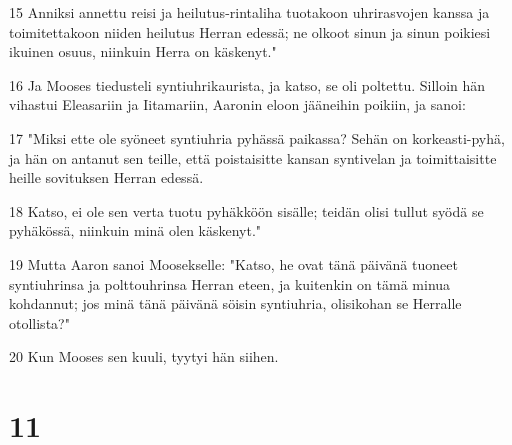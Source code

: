 \par 15 Anniksi annettu reisi ja heilutus-rintaliha tuotakoon uhrirasvojen kanssa ja toimitettakoon niiden heilutus Herran edessä; ne olkoot sinun ja sinun poikiesi ikuinen osuus, niinkuin Herra on käskenyt."
\par 16 Ja Mooses tiedusteli syntiuhrikaurista, ja katso, se oli poltettu. Silloin hän vihastui Eleasariin ja Iitamariin, Aaronin eloon jääneihin poikiin, ja sanoi:
\par 17 "Miksi ette ole syöneet syntiuhria pyhässä paikassa? Sehän on korkeasti-pyhä, ja hän on antanut sen teille, että poistaisitte kansan syntivelan ja toimittaisitte heille sovituksen Herran edessä.
\par 18 Katso, ei ole sen verta tuotu pyhäkköön sisälle; teidän olisi tullut syödä se pyhäkössä, niinkuin minä olen käskenyt."
\par 19 Mutta Aaron sanoi Moosekselle: "Katso, he ovat tänä päivänä tuoneet syntiuhrinsa ja polttouhrinsa Herran eteen, ja kuitenkin on tämä minua kohdannut; jos minä tänä päivänä söisin syntiuhria, olisikohan se Herralle otollista?"
\par 20 Kun Mooses sen kuuli, tyytyi hän siihen.

\chapter{11}

